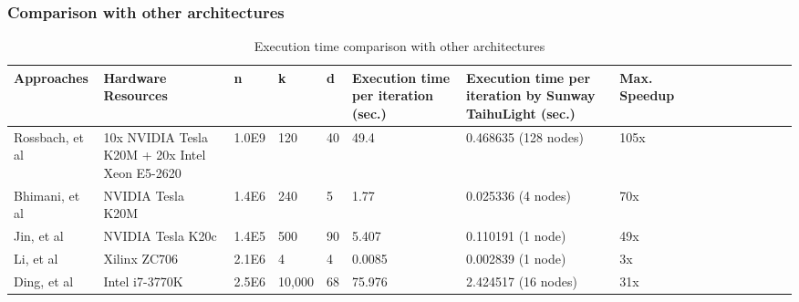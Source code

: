 \documentclass[10pt,journal,compsoc]{IEEEtran}
\begin{document}
{%

\subsubsection{Comparison with other architectures}

\begin{table}
  \caption{Execution time comparison with other architectures}
  \center
  \label{ccpu}
   \begin{tabular}{p{2cm} p{3.2cm} p{1cm} p{1cm}p{0.5cm}p{2cm}p{3cm}p{1cm}p{1cm} c c c c c c c }
    \hline
    Approaches&Hardware Resources &n & k & d& Execution time per iteration (sec.) & Execution time per iteration by Sunway TaihuLight (sec.) & Max. Speedup\\
    \hline
    Rossbach, et al\cite{rossbach2013dandelion} &10x NVIDIA Tesla K20M + 20x Intel Xeon E5-2620&1.0E9 &120 &40 &49.4&0.468635 (128 nodes) & 105x\\
      \hline
    Bhimani, et al\cite{bhimani2015accelerating} &NVIDIA Tesla K20M&1.4E6 &240 &5 &1.77&0.025336 (4 nodes) & 70x\\
      \hline
    Jin, et al\cite{jin2018high} &NVIDIA Tesla K20c&1.4E5&500&90&5.407&0.110191 (1 node) & 49x\\ 
      \hline
    Li, et al\cite{li2016high}&Xilinx ZC706&2.1E6&4&4&0.0085&0.002839 (1 node) & 3x\\
      \hline
    Ding, et al\cite{ding2015yinyang} &Intel i7-3770K&2.5E6 &10,000 &68 &75.976&2.424517 (16 nodes) & 31x\\


\end{tabular}
\end{table}}
\end{document}
